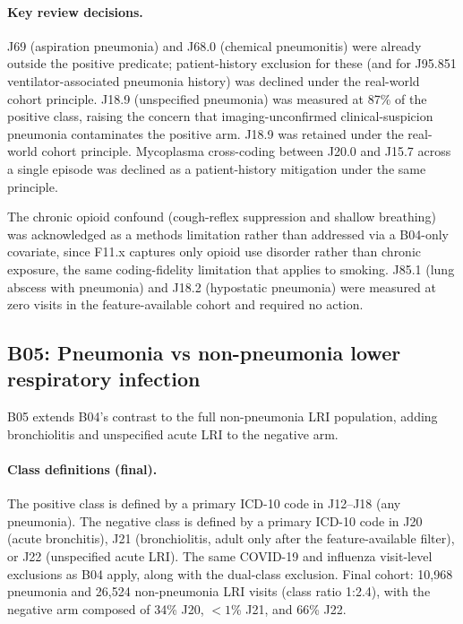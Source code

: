 \documentclass[utf8]{frontiers_suppmat} %
\begin{document}
\paragraph{Key review decisions.} J69 (aspiration pneumonia) and
J68.0 (chemical pneumonitis) were already outside the positive
predicate; patient-history exclusion for these (and for J95.851
ventilator-associated pneumonia history) was declined under the
real-world cohort principle. J18.9 (unspecified pneumonia) was
measured at 87\% of the positive class, raising the concern that
imaging-unconfirmed clinical-suspicion pneumonia contaminates the
positive arm. J18.9 was retained under the real-world cohort principle.
Mycoplasma cross-coding between J20.0
and J15.7 across a single episode was declined as a patient-history
mitigation under the same principle.

The chronic opioid confound (cough-reflex suppression and shallow
breathing) was acknowledged as a methods limitation rather than
addressed via a B04-only covariate, since F11.x captures only opioid
use disorder rather than chronic exposure, the same coding-fidelity
limitation that applies to smoking. J85.1 (lung abscess with pneumonia)
and J18.2 (hypostatic pneumonia) were measured at zero visits in the
feature-available cohort and required no action.

\subsection{B05: Pneumonia vs non-pneumonia lower respiratory infection}
\label{sec:supp-b05}

B05 extends B04's contrast to the full non-pneumonia LRI population,
adding bronchiolitis and unspecified acute LRI to the negative arm.

\paragraph{Class definitions (final).} The positive class is defined
by a primary ICD-10 code in J12--J18 (any pneumonia). The negative
class is defined by a primary ICD-10 code in J20 (acute bronchitis),
J21 (bronchiolitis, adult only after the feature-available
filter), or J22 (unspecified acute LRI). The same COVID-19 and
influenza visit-level exclusions as B04 apply, along with the
dual-class exclusion. Final cohort: 10{,}968 pneumonia and 26{,}524
non-pneumonia LRI visits (class ratio 1:2.4), with the negative arm
composed of 34\% J20, $<1$\% J21, and 66\% J22.
\end{document}
